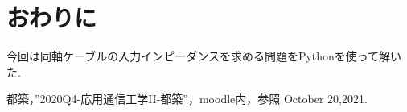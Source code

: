 \documentclass[a4j,12pt,]{jarticle}
\begin{document}
\section{おわりに}

今回は同軸ケーブルの入力インピーダンスを求める問題をPythonを使って解いた.

\begin{thebibliography}{5}
  都築，”2020Q4-応用通信工学II-都築”，moodle内，参照 October 20,2021.
\end{thebibliography}
\end{document}
